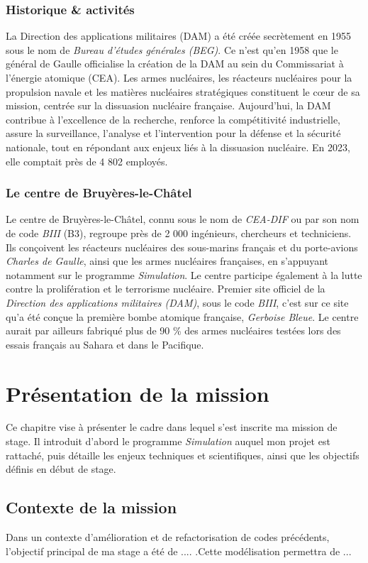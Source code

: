 \documentclass[12pt,a4paper]{report}
\begin{document}
\subsection{Historique \& activités}
La Direction des applications militaires (DAM) a été créée secrètement en 1955 sous le nom de \textit{Bureau d'études générales (BEG)}. Ce n'est qu'en 1958 que le général de Gaulle officialise la création de la DAM au sein du Commissariat à l'énergie atomique (CEA). Les armes nucléaires, les réacteurs nucléaires pour la propulsion navale et les matières nucléaires stratégiques constituent le cœur de sa mission, centrée sur la dissuasion nucléaire française. Aujourd'hui, la DAM contribue à l'excellence de la recherche, renforce la compétitivité industrielle, assure la surveillance, l'analyse et l'intervention pour la défense et la sécurité nationale, tout en répondant aux enjeux liés à la dissuasion nucléaire. En 2023, elle comptait près de 4 802 employés.
\subsection{Le centre de Bruyères-le-Châtel}
Le centre de Bruyères-le-Châtel, connu sous le nom de \textit{CEA-DIF} ou par son nom de code \textit{BIII} (B3), regroupe près de 2 000 ingénieurs, chercheurs et techniciens. Ils conçoivent les réacteurs nucléaires des sous-marins français et du porte-avions \textit{Charles de Gaulle}, ainsi que les armes nucléaires françaises, en s’appuyant notamment sur le programme \textit{Simulation}. Le centre participe également à la lutte contre la prolifération et le terrorisme nucléaire.
Premier site officiel de la \textit{Direction des applications militaires (DAM)}, sous le code \textit{BIII}, c’est sur ce site qu’a été conçue la première bombe atomique française, \textit{Gerboise Bleue}. Le centre aurait par ailleurs fabriqué plus de 90 \% des armes nucléaires testées lors des essais français au Sahara et dans le Pacifique.

\chapter{Présentation de la mission}

Ce chapitre vise à présenter le cadre dans lequel s’est inscrite ma mission de stage. Il introduit d’abord le programme \textit{Simulation} auquel mon projet est rattaché, puis détaille les enjeux techniques et scientifiques, ainsi que les objectifs définis en début de stage.

\section{Contexte de la mission}
 Dans un contexte d'amélioration et de refactorisation de codes précédents, l'objectif principal de ma stage a été de .... .Cette modélisation permettra de ...
\end{document}
